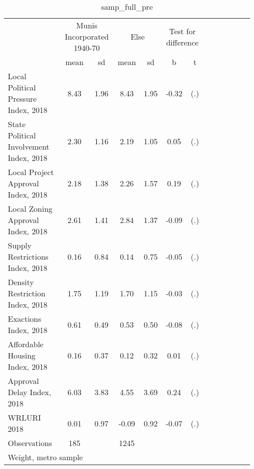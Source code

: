 \begin{table}[htbp]\centering
\def\sym#1{\ifmmode^{#1}\else\(^{#1}\)\fi}
\caption{samp\_full\_pre \label{tab1}}
\begin{tabular}{l*{3}{cccc}}
\toprule
                    &\multicolumn{2}{c}{Munis Incorporated 1940-70}&\multicolumn{2}{c}{Else} &\multicolumn{2}{c}{Test for difference}\\
                    &        mean&          sd&        mean&          sd&           b         &           t\\
\midrule
Local Political Pressure Index, 2018&        8.43&        1.96&        8.43&        1.95&       -0.32         &         (.)\\
State Political Involvement Index, 2018&        2.30&        1.16&        2.19&        1.05&        0.05         &         (.)\\
Local Project Approval Index, 2018&        2.18&        1.38&        2.26&        1.57&        0.19         &         (.)\\
Local Zoning Approval Index, 2018&        2.61&        1.41&        2.84&        1.37&       -0.09         &         (.)\\
Supply Restrictions Index, 2018&        0.16&        0.84&        0.14&        0.75&       -0.05         &         (.)\\
Density Restriction Index, 2018&        1.75&        1.19&        1.70&        1.15&       -0.03         &         (.)\\
Exactions Index, 2018&        0.61&        0.49&        0.53&        0.50&       -0.08         &         (.)\\
Affordable Housing Index, 2018&        0.16&        0.37&        0.12&        0.32&        0.01         &         (.)\\
Approval Delay Index, 2018&        6.03&        3.83&        4.55&        3.69&        0.24         &         (.)\\
WRLURI 2018         &        0.01&        0.97&       -0.09&        0.92&       -0.07         &         (.)\\
\midrule
Observations        &         185&            &        1245&            &                     &            \\
\bottomrule
\multicolumn{7}{l}{\footnotesize Weight, metro sample}\\
\end{tabular}
\end{table}
